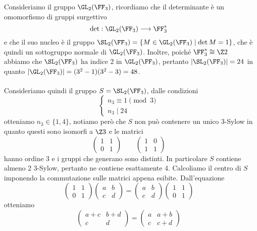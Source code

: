 \documentclass[11pt]{scrartcl}
\begin{document}
Consideriamo il gruppo $\GL_2(\FF_3)$, ricordiamo che il determinante è 
un omomorfismo di gruppi surgettivo
\[
    \det: \GL_2(\FF_3) \longrightarrow \FF_3^*
\]
e che il suo nucleo è il gruppo $\SL_2(\FF_3) = \{M \in \GL_2(\FF_3)\mid \det M = 1\}$,
che è quindi un sottogruppo normale di $\GL_2(\FF_3)$. Inoltre, poiché
$\FF_3^* \cong \Z2$ abbiamo che $\SL_2(\FF_3)$ ha indice 2 in $\GL_2(\FF_3)$, pertanto 
$|\SL_2(\FF_3)| = 24$ in quanto $|\GL_2(\FF_3)| = (3^2 - 1)(3^2 - 3) = 48$.
\\\\
Consideriamo quindi il gruppo $S = \SL_2(\FF_3)$, dalle condizioni 
\[
    \begin{cases}
        n_3 \equiv 1 \pmod 3\\
        n_3 \mid 24
    \end{cases}
\]
otteniamo $n_3 \in \{1, 4\}$, notiamo però che $S$ non può contenere un unico 
3-Sylow in quanto questi sono isomorfi a $\Z3$ e le matrici 
\[
    \begin{pmatrix}
        1 & 1\\
        0 & 1
    \end{pmatrix}\qquad
    \begin{pmatrix}
        1 & 0\\
        1 & 1
    \end{pmatrix}
\]
hanno ordine 3 e i gruppi che generano sono distinti. In particolare $S$
contiene almeno 2 3-Sylow, pertanto ne contiene esattamente 4.
Calcoliamo il centro di $S$ imponendo la commutazione sulle matrici appena 
esibite. Dall'equazione 
\[
    \begin{pmatrix}
        1 & 1\\
        0 & 1
    \end{pmatrix}
    \begin{pmatrix}
        a & b\\
        c & d
    \end{pmatrix} = 
    \begin{pmatrix}
        a & b\\
        c & d
    \end{pmatrix}
    \begin{pmatrix}
        1 & 1\\
        0 & 1
    \end{pmatrix}
\]
otteniamo 
\[
    \begin{pmatrix}
        a + c & b + d\\
        c & d
    \end{pmatrix} = 
    \begin{pmatrix}
        a & a + b\\
        c & c + d
    \end{pmatrix}
\]
\end{document}
